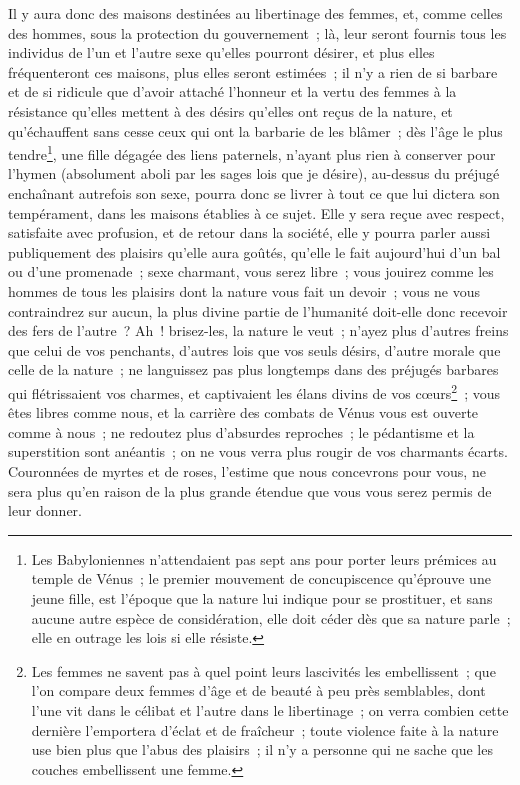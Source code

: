 \documentclass[french,twoside]{book} %
\begin{document}
Il y aura donc des maisons destinées au libertinage des femmes, et, comme celles des hommes, sous la protection du gouvernement ; là, leur seront fournis tous les individus de l’un et l’autre sexe qu’elles pourront désirer, et plus elles fréquenteront ces maisons, plus elles seront estimées ; il n’y a rien de si barbare et de si ridicule que d’avoir attaché l’honneur et la vertu des femmes à la résistance qu’elles mettent à des désirs qu’elles ont reçus de la nature, et qu’échauffent sans cesse ceux qui ont la barbarie de les blâmer ; dès l’âge le plus tendre\footnote{ Les Babyloniennes n’attendaient pas sept ans pour porter leurs prémices au temple de Vénus ; le premier mouvement de concupiscence qu’éprouve une jeune fille, est l’époque que la nature lui indique pour se prostituer, et sans aucune autre espèce de considération, elle doit céder dès que sa nature parle ; elle en outrage les lois si elle résiste.}, une fille dégagée des liens paternels, n’ayant plus rien à conserver pour l’hymen (absolument aboli par les sages lois que je désire), au-dessus du préjugé enchaînant autrefois son sexe, pourra donc se livrer à tout ce que lui dictera son tempérament, dans les maisons établies à ce sujet. Elle y sera reçue avec respect, satisfaite avec profusion, et de retour dans la société, elle y pourra parler aussi publiquement des plaisirs qu’elle aura goûtés, qu’elle le fait aujourd’hui d’un bal ou d’une promenade ; sexe charmant, vous serez libre ; vous jouirez comme les hommes de tous les plaisirs dont la nature vous fait un devoir ; vous ne vous contraindrez sur aucun, la plus divine partie de l’humanité doit-elle donc recevoir des fers de l’autre ? Ah ! brisez-les, la nature le veut ; n’ayez plus d’autres freins que celui de vos penchants, d’autres lois que vos seuls désirs, d’autre morale que celle de la nature ; ne languissez pas plus longtemps dans des préjugés barbares qui flétrissaient vos charmes, et captivaient les élans divins de vos cœurs\footnote{ Les femmes ne savent pas à quel point leurs lascivités les embellissent ; que l’on compare deux femmes d’âge et de beauté à peu près semblables, dont l’une vit dans le célibat et l’autre dans le libertinage ; on verra combien cette dernière l’emportera d’éclat et de fraîcheur ; toute violence faite à la nature use bien plus que l’abus des plaisirs ; il n’y a personne qui ne sache que les couches embellissent une femme.} ; vous êtes libres comme nous, et la carrière des combats de Vénus vous est ouverte comme à nous ; ne redoutez plus d’absurdes reproches ; le pédantisme et la superstition sont anéantis ; on ne vous verra plus rougir de vos charmants écarts. Couronnées de myrtes et de roses, l’estime que nous concevrons pour vous, ne sera plus qu’en raison de la plus grande étendue que vous vous serez permis de leur donner.\par
\end{document}
